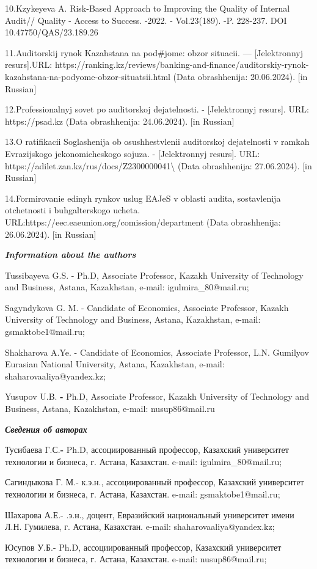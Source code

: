 \begin{references}
10.Kzykeyeva A. Risk-Based Approach to Improving the Quality of Internal
Audit// Quality - Access to Success. -2022. - Vol.23(189). -P. 228-237.
DOI 10.47750/QAS/23.189.26

11.Auditorskij rynok Kazahstana na pod\#jome: obzor situacii. ---
{[}Jelektronnyj resurs{]}.URL:
https://ranking.kz/reviews/banking-and-finance/auditorskiy-rynok-kazahstana-na-podyome-obzor-situatsii.html
(Data obrashhenija: 20.06.2024). {[}in Russian{]}

12.Professional\textquotesingle nyj sovet po auditorskoj
dejatel\textquotesingle nosti. - {[}Jelektronnyj resurs{]}. URL:
https://psad.kz (Data obrashhenija: 24.06.2024). {[}in Russian{]}

13.O ratifikacii Soglashenija ob osushhestvlenii auditorskoj
dejatel\textquotesingle nosti v ramkah Evrazijskogo jekonomicheskogo
sojuza. - {[}Jelektronnyj resurs{]}. URL:
https://adilet.zan.kz/rus/docs/Z2300000041\textbackslash{} (Data
obrashhenija: 27.06.2024). {[}in Russian{]}

14.Formirovanie edinyh rynkov uslug EAJeS v oblasti audita, sostavlenija
otchetnosti i buhgalterskogo ucheta.
URL:https://eec.eaeunion.org/comission/department (Data obrashhenija:
26.06.2024). {[}in Russian{]}
\end{references}
\begin{authorinfo}

  \hspace{1em}\emph{\textbf{Information about the authors}}

Tussibayeva G.S. - Ph.D, Associate Professor, Kazakh University of
Technology and Business, Astana, Kazakhstan, e-mail:
igulmira\_80@mail.ru;

Sagyndykova G. M. - Candidate of Economics, Associate Professor, Kazakh
University of Technology and Business, Astana, Kazakhstan, e-mail:
gsmaktobe1@mail.ru;

Shakharova A.Ye. - Candidate of Economics, Associate Professor, L.N.
Gumilyov Eurasian National University, Astana, Kazakhstan, e-mail:
shaharovaaliya@yandex.kz;

Yusupov U.B. \textbf{-} Ph.D, Associate Professor, Kazakh University of
Technology and Business, Astana, Kazakhstan, e-mail: nusup86@mail.ru

\hspace{1em}\emph{\textbf{Сведения об авторах}}

Тусибаева Г.С.\textbf{-} Ph.D, ассоциированный профессор, Казахский
университет технологии и бизнеса, г. Астана, Казахстан. e-mail:
igulmira\_80@mail.ru;

Сагиндыкова Г. М.- к.э.н., ассоциированный профессор, Казахский
университет технологии и бизнеса, г. Астана, Казахстан. e-mail:
gsmaktobe1@mail.ru;

Шахарова А.Е.- .э.н., доцент, Евразийский национальный университет имени
Л.Н. Гумилева, г. Астана, Казахстан. e-mail: shaharovaaliya@yandex.kz;

Юсупов У.Б.- Ph.D, ассоциированный профессор, Казахский университет
технологии и бизнеса, г. Астана, Казахстан. e-mail: nusup86@mail.ru;
\end{authorinfo}
